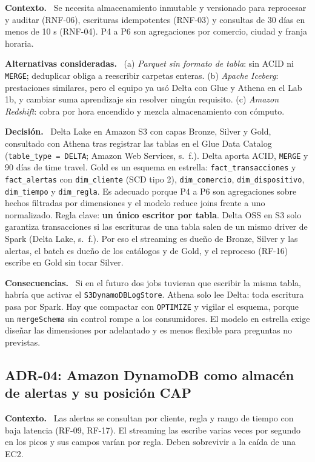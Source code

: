\documentclass[12pt,letterpaper]{article}
\newcommand{\code}[1]{{\small\texttt{#1}}}
\newcommand{\adrpart}[1]{\textbf{#1.}~}
\begin{document}
\adrpart{Contexto} Se necesita almacenamiento inmutable y versionado para reprocesar y auditar (RNF-06), escrituras idempotentes (RNF-03) y consultas de 30 días en menos de 10 s (RNF-04). P4 a P6 son agregaciones por comercio, ciudad y franja horaria.

\adrpart{Alternativas consideradas} (a) \emph{Parquet sin formato de tabla}: sin ACID ni \code{MERGE}; deduplicar obliga a reescribir carpetas enteras. (b) \emph{Apache Iceberg}: prestaciones similares, pero el equipo ya usó Delta con Glue y Athena en el Lab 1b, y cambiar suma aprendizaje sin resolver ningún requisito. (c) \emph{Amazon Redshift}: cobra por hora encendido y mezcla almacenamiento con cómputo.

\adrpart{Decisión} Delta Lake en Amazon S3 con capas Bronze, Silver y Gold, consultado con Athena tras registrar las tablas en el Glue Data Catalog (\code{table\_type = DELTA}; Amazon Web Services, s.~f.). Delta aporta ACID, \code{MERGE} y 90 días de time travel. Gold es un esquema en estrella: \code{fact\_transacciones} y \code{fact\_alertas} con \code{dim\_cliente} (SCD tipo 2), \code{dim\_comercio}, \code{dim\_dispositivo}, \code{dim\_tiempo} y \code{dim\_regla}. Es adecuado porque P4 a P6 son agregaciones sobre hechos filtradas por dimensiones y el modelo reduce joins frente a uno normalizado. Regla clave: \textbf{un único escritor por tabla}. Delta OSS en S3 solo garantiza transacciones si las escrituras de una tabla salen de un mismo driver de Spark (Delta Lake, s.~f.). Por eso el streaming es dueño de Bronze, Silver y las alertas, el batch es dueño de los catálogos y de Gold, y el reproceso (RF-16) escribe en Gold sin tocar Silver.

\adrpart{Consecuencias} Si en el futuro dos jobs tuvieran que escribir la misma tabla, habría que activar el \code{S3DynamoDBLogStore}. Athena solo lee Delta: toda escritura pasa por Spark. Hay que compactar con \code{OPTIMIZE} y vigilar el esquema, porque un \code{mergeSchema} sin control rompe a los consumidores. El modelo en estrella exige diseñar las dimensiones por adelantado y es menos flexible para preguntas no previstas.

\subsection*{ADR-04: Amazon DynamoDB como almacén de alertas y su posición CAP}

\adrpart{Contexto} Las alertas se consultan por cliente, regla y rango de tiempo con baja latencia (RF-09, RF-17). El streaming las escribe varias veces por segundo en los picos y sus campos varían por regla. Deben sobrevivir a la caída de una EC2.
\end{document}
